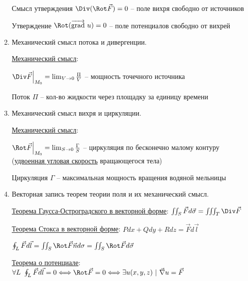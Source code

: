 \documentclass[12pt]{article}
\begin{document}
\begin{enumerate}
        Смысл утверждения $\Div (\Rot \vec F) = 0$ -- поле вихря свободно от источников

        Утверждение $\Rot (\overrightarrow{\operatorname{grad}}\ u) = 0$ -- поле потенциалов свободно от вихрей


        \item Механический смысл потока и дивергенции.

        \hyperlink{divergencemechanicalmeaning}{Механический смысл}:

        $\Div \vec{F} \Big|_{M_0} = \lim_{V \to 0} \frac{\Pi}{V}$ -- мощность точечного источника

        Поток $\Pi$ -- кол-во жидкости через площадку за единицу времени


        \item Механический смысл вихря и циркуляции.

        \hyperlink{rotormechanicalmeaning}{Механический смысл}:

        $\Rot \vec{F} \Big|_{M_0} = \lim_{S \to 0} \frac{\Gamma}{S}$ -- циркуляция по бесконечно малому контуру (\hyperlink{rotormechanicalmeaning2}{удвоенная угловая скорость} вращающегося тела)

        Циркуляция $\Gamma$ -- максимальная мощность вращения водяной мельницы


        \item Векторная запись теорем теории поля и их механический смысл.

        \hyperlink{gaussostrogradskyyvector}{Теорема Гаусса-Остроградского в векторной форме}: $\iint_S \vec{F} d\vec{\sigma} = \iiint_T \Div \vec{F}$

        \hyperlink{theoremGaussOstrogradskyyinvectorform}{Теорема Стокса в векторной форме}: $Pdx + Qdy + Rdz = \vec{F}d\vec{l}$

        $\oint_L \vec{F}d\vec{l} = \iint_S \Rot \vec{F} \vec{n} d\sigma = \iint_S \Rot \vec{F} d\vec{\sigma}$

        \hyperlink{theoremaboutpotentialinvectorform}{Теорема о потенциале}: $\forall L \ \oint_L \vec{F}d\vec{l} = 0 \Longleftrightarrow \Rot \vec{F} = 0 \Longleftrightarrow \exists u(x, y, z) \ | \ \vec\nabla u = \vec{F}$


    \end{enumerate}
\end{document}

